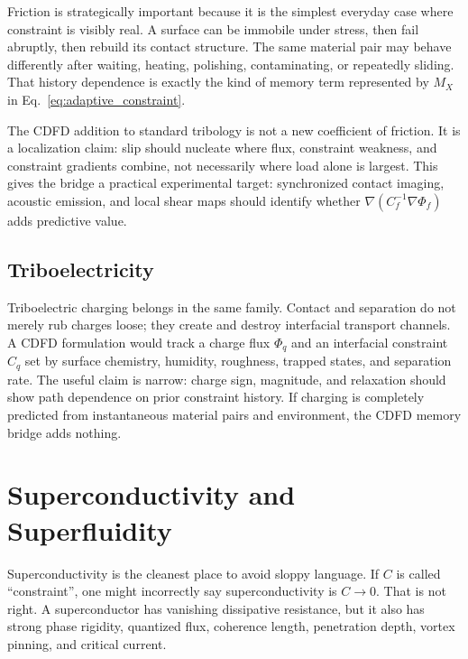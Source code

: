 \documentclass[11pt]{article}
\begin{document}
Friction is strategically important because it is the simplest everyday case where constraint is visibly real. A surface can be immobile under stress, then fail abruptly, then rebuild its contact structure. The same material pair may behave differently after waiting, heating, polishing, contaminating, or repeatedly sliding. That history dependence is exactly the kind of memory term represented by $M_X$ in Eq.~\eqref{eq:adaptive_constraint}.

The CDFD addition to standard tribology is not a new coefficient of friction. It is a localization claim: slip should nucleate where flux, constraint weakness, and constraint gradients combine, not necessarily where load alone is largest. This gives the bridge a practical experimental target: synchronized contact imaging, acoustic emission, and local shear maps should identify whether $\nabla(C_f^{-1}\nabla \Phi_f)$ adds predictive value.

\subsection{Triboelectricity}

Triboelectric charging belongs in the same family. Contact and separation do not merely rub charges loose; they create and destroy interfacial transport channels. A CDFD formulation would track a charge flux $\Phi_q$ and an interfacial constraint $C_q$ set by surface chemistry, humidity, roughness, trapped states, and separation rate. The useful claim is narrow: charge sign, magnitude, and relaxation should show path dependence on prior constraint history. If charging is completely predicted from instantaneous material pairs and environment, the CDFD memory bridge adds nothing.

\section{Superconductivity and Superfluidity}

Superconductivity is the cleanest place to avoid sloppy language. If $C$ is called ``constraint'', one might incorrectly say superconductivity is $C\to0$. That is not right. A superconductor has vanishing dissipative resistance, but it also has strong phase rigidity, quantized flux, coherence length, penetration depth, vortex pinning, and critical current.
\end{document}
